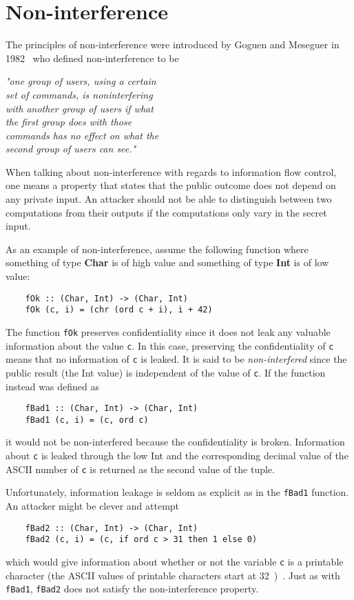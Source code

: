 \section{Non-interference}
The principles of non-interference were introduced by Goguen and Meseguer in 1982~\cite{non-interference-goguen-meseguer} who defined non-interference to be
\newline
\begin{center}
  \emph{"one group of users, using a certain\\set of commands, is noninterfering\\with another group of users if what\\the first group does with those\\commands has no effect on what the\\second group of users can see."}
\end{center}
When talking about non-interference with regards to information flow control, one means a property that states that the public outcome does not depend on any private input. An attacker should not be able to distinguish between two computations from their outputs if the computations only vary in the secret input.

As an example of non-interference, assume the following function where something of type \textbf{Char} is of high value and something of type \textbf{Int} is of low value:
\begin{verbatim}
    fOk :: (Char, Int) -> (Char, Int)
    fOk (c, i) = (chr (ord c + i), i + 42)
\end{verbatim}
The function {\tt fOk} preserves confidentiality since it does not leak any valuable information about the value {\tt c}. In this case, preserving the confidentiality of {\tt c} means that no information of {\tt c} is leaked. It is said to be \emph{non-interfered} since the public result (the Int value) is independent of the value of {\tt c}. If the function instead was defined as
\begin{verbatim}
    fBad1 :: (Char, Int) -> (Char, Int)
    fBad1 (c, i) = (c, ord c)
\end{verbatim}
it would not be non-interfered because the confidentiality is broken. Information about {\tt c} is leaked through the low Int and the corresponding decimal value of the ASCII number of {\tt c} is returned as the second value of the tuple.

Unfortunately, information leakage is seldom as explicit as in the {\tt fBad1} function. An attacker might be clever and attempt
\begin{verbatim}
    fBad2 :: (Char, Int) -> (Char, Int)
    fBad2 (c, i) = (c, if ord c > 31 then 1 else 0)
\end{verbatim}
which would give information about whether or not the variable {\tt c} is a printable character (the ASCII values of printable characters start at 32~\cite{ascii})~\cite{seclib}. Just as with {\tt fBad1}, {\tt fBad2} does not satisfy the non-interference property.

